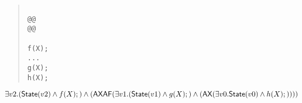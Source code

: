 \documentclass{article}
\newcommand{\AX}{\mbox{\sf{AX}}}
\newcommand{\AF}{\mbox{\sf{AF}}}
\newcommand{\msf}[1]{\mbox{\sf{{#1}}}}
\begin{document}
\begin{quote}\begin{verbatim}

@@
@@

f(X);
...
g(X);
h(X);
\end{verbatim}\end{quote}

\[
\exists v2 . (\msf{State}(v2) \wedge f(X);) \wedge (\AX\AF(\exists v1 . (\msf{State}(v1) \wedge g(X);) \wedge (\AX(\exists v0 . \msf{State}(v0) \wedge h(X);))))
\]
\end{document}
